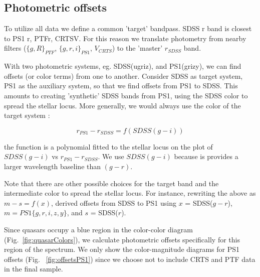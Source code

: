 \documentclass[twocolumn]{aastex62}
\begin{document}
\subsection{Photometric offsets}

To utilize all data we define a common 'target' bandpass. SDSS r band is closest to PS1 r, PTFr, CRTSV. For this reason we translate photometry from nearby filters ($\{g,R\}_{PTF}$, $\{g,r,i\}_{PS1}$, $V_{CRTS}$) to the  'master' $r_{SDSS}$  band.

With two photometric systems, eg. SDSS(ugriz), and PS1(grizy),  we can find offsets (or color terms) from one to another. Consider SDSS as target system,  PS1 as the auxiliary system, so that we find offsets from PS1 to SDSS. This amounts to creating 'synthetic' SDSS bands from PS1, using the SDSS color to spread the stellar locus. More generally, we would always use the color of the target system : 

\begin{equation}
r_{PS1} -  r_{SDSS} = f ( SDSS (g-i ))
\end{equation}

the function is a polynomial fitted to the stellar locus on the plot of $SDSS (g-i )$ vs $r_{PS1} -  r_{SDSS} $. We use $SDSS(g-i)$ because is provides a larger wavelength baseline than $(g-r)$. 

Note that there are other possible choices for the target band and the intermediate color to spread the stellar locus. For instance, rewriting the above as  $m - s = f(x)$, \cite{tonry2012} derived offsets from SDSS to PS1  using $x$ = SDSS($g-r$), $m = PS1 \{g,r,i,z,y\}$, and $s$ = SDSS($r$).

Since quasars occupy a blue region in the color-color diagram (Fig.~\ref{fig:quasarColors}), we calculate photometric offsets specifically for this region of the spectrum.  We only show the color-magnitude diagrams  for PS1 offsets  (Fig. ~\ref{fig:offsetsPS1}) since we choose not to include CRTS and PTF data in the final sample. 

\begin{figure*}
\caption{Regions occupied in color-color space by S82 quasars (colors) and standard stars (contours) 	\citep{schneider2010}. We show only 10 000  randomly chosen stars from the  full 1 mln + standard stars catalog \citealt{ivezic2007}. }
\label{fig:quasarColors}
\end{figure*} 


\begin{figure*}
\caption{The SDSS-PS1 offsets. We plot only bright stars that have SDSS(r) < 19, and that fulfill  mErr * sqrt(Nobs) < 0.03 . Each panel plots about 6000 stars of the 47000 CRTS S82 stars . Vertical dashed lines mark the region in SDSS color space occupied by quasars (see Fig.~\ref{fig:quasarColors}), used to fit the stellar locus with a polynomial. }
\label{fig:offsetsPS1}
\end{figure*} 
\end{document}
